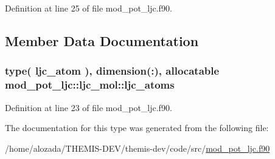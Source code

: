 Definition at line 25 of file mod\+\_\+pot\+\_\+ljc.\+f90.



\subsection{Member Data Documentation}
\subsubsection[{\texorpdfstring{ljc\+\_\+atoms}{ljc_atoms}}]{\setlength{\rightskip}{0pt plus 5cm}type( {\bf ljc\+\_\+atom} ), dimension(\+:), allocatable mod\+\_\+pot\+\_\+ljc\+::ljc\+\_\+mol\+::ljc\+\_\+atoms}\hypertarget{structmod__pot__ljc_1_1ljc__mol_a65026a4645ff0576b8a7189649b47512}{}\label{structmod__pot__ljc_1_1ljc__mol_a65026a4645ff0576b8a7189649b47512}


Definition at line 23 of file mod\+\_\+pot\+\_\+ljc.\+f90.



The documentation for this type was generated from the following file\+:\begin{DoxyCompactItemize}
\item 
/home/alozada/\+T\+H\+E\+M\+I\+S-\/\+D\+E\+V/themis-\/dev/code/src/\hyperlink{mod__pot__ljc_8f90}{mod\+\_\+pot\+\_\+ljc.\+f90}\end{DoxyCompactItemize}
